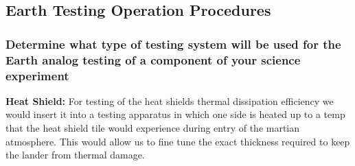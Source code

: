 \documentclass[%
 portrait,
 aapm,
 mph,%
 amsmath,amssymb,
 reprint,%
]{revtex4-2}
\begin{document}
\subsection{Earth Testing Operation Procedures}

\subsubsection{Determine what type of testing system will be used for the Earth analog testing of a component of your science experiment}
\textbf{Heat Shield:} For testing of the heat shields thermal dissipation efficiency we would insert it into a testing apparatus in which one side is heated up to a temp that the heat shield tile would experience during entry of the martian atmosphere.  This would allow us to fine tune the exact thickness required to keep the lander from thermal damage.
\end{document}
